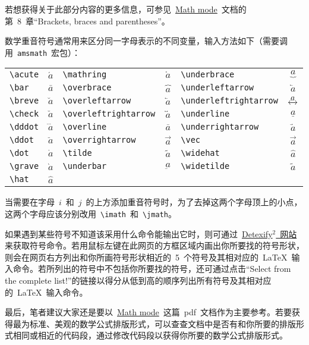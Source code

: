 	若想获得关于此部分内容的更多信息，可参见~\href{http://tug.ctan.org/cgi-bin/ctanPackageInformation.py?id=voss-mathmode}{Math mode}~文档的第~8~章“Brackets, braces and parentheses”。
	
	数学重音符号通常用来区分同一字母表示的不同变量，输入方法如下（需要调用~\verb|amsmath|~宏包）：
	
	\vspace{0.5em}\noindent\wuhao\begin{tabularx}{\textwidth}{Xc|Xc|Xc}
		\verb|\acute| & $\acute{a}$ & \verb|\mathring| & $\mathring{a}$ & \verb|\underbrace| & $\underbrace{a}$ \\
		\verb|\bar| & $\bar{a}$ & \verb|\overbrace| & $\overbrace{a}$ & \verb|\underleftarrow| & $\underleftarrow{a}$ \\
		\verb|\breve| & $\breve{a}$ & \verb|\overleftarrow| & $\overleftarrow{a}$ & \verb|\underleftrightarrow| & $\underleftrightarrow{a}$ \\
		\verb|\check| & $\check{a}$ & \verb|\overleftrightarrow| & $\overleftrightarrow{a}$ & \verb|\underline| & $\underline{a}$ \\
		\verb|\dddot| & $\dddot{a}$ & \verb|\overline| & $\overline{a}$ & \verb|\underrightarrow| & $\underrightarrow{a}$ \\
		\verb|\ddot| & $\ddot{a}$ & \verb|\overrightarrow| & $\overrightarrow{a}$ & \verb|\vec| & $\vec{a}$ \\
		\verb|\dot| & $\dot{a}$ & \verb|\tilde| & $\tilde{a}$ & \verb|\widehat| & $\widehat{a}$ \\
		\verb|\grave| & $\grave{a}$ & \verb|\underbar| & $\underbar{a}$ & \verb|\widetilde| & $\widetilde{a}$ \\
		\verb|\hat| & $\hat{a}$ 
	\end{tabularx}\vspace{0.5em}
	\xiaosi 当需要在字母~$i$~和~$j$~的上方添加重音符号时，为了去掉这两个字母顶上的小点，这两个字母应该分别改用~\verb|\imath|~和~\verb|\jmath|。
	
	如果遇到某些符号不知道该采用什么命令能输出它时，则可通过~\href{http://detexify.kirelabs.org/classify.html}{Detexify$^2$~网站}来获取符号命令。若用鼠标左键在此网页的方框区域内画出你所要找的符号形状，则会在网页右方列出和你所画符号形状相近的~5~个符号及其相对应的~\LaTeX~输入命令。若所列出的符号中不包括你所要找的符号，还可通过点击“Select from the complete list!”的链接以得分从低到高的顺序列出所有符号及其相对应的~\LaTeX~输入命令。
	
	最后，笔者建议大家还是要以~\href{http://tug.ctan.org/cgi-bin/ctanPackageInformation.py?id=voss-mathmode}{Math mode}~这篇~pdf~文档作为主要参考。若要获得最为标准、美观的数学公式排版形式，可以查查文档中是否有和你所要的排版形式相同或相近的代码段，通过修改代码段以获得你所要的数学公式排版形式。
	
	
	
	
	
	
	
	
	
